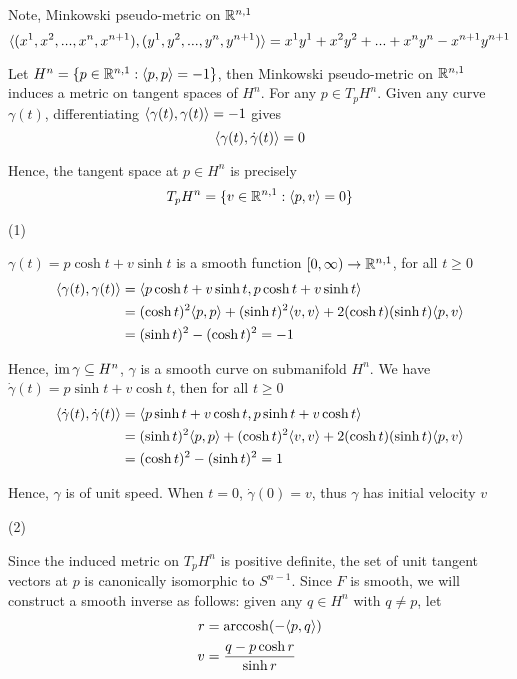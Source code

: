 \begin{longproof}
	Note, Minkowski pseudo-metric on $\mathbb{R}^{n, 1}$
	$$
		\langle(x^1, x^2, ..., x^n, x^{n+1}), (y^1, y^2, ..., y^n, y^{n+1})\rangle = x^1 y^1 + x^2 y^2 + ... + x^n y^n - x^{n+1} y^{n+1}
	$$
	
	Let $H^n = \{p \in \mathbb{R}^{n, 1}: \langle p, p\rangle = -1\}$, then Minkowski pseudo-metric on $\mathbb{R}^{n, 1}$ induces a metric on tangent spaces of $H^n$. For any $p \in T_p H^n$. Given any curve $\gamma(t)$, differentiating $\langle\gamma(t), \gamma(t)\rangle = -1$ gives
	$$
		\langle\gamma(t), \dot{\gamma}(t)\rangle = 0
	$$
	
	Hence, the tangent space at $p \in H^n$ is precisely
	$$
		T_p H^n = \{v \in \mathbb{R}^{n, 1}: \langle p, v\rangle = 0\}
	$$
	
	
	(1)
	
	$\gamma(t) = p \cosh t + v \sinh t$ is a smooth function $[0, \infty) \to \mathbb{R}^{n, 1}$, for all $t \geq 0$
	\begin{align*}
		\langle\gamma(t), \gamma(t)\rangle
		&= \langle p \cosh t + v \sinh t, p \cosh t + v \sinh t\rangle \\
		&= (\cosh t)^2 \langle p, p\rangle + (\sinh t)^2 \langle v, v\rangle + 2 (\cosh t)(\sinh t) \langle p, v\rangle \\
		&= (\sinh t)^2 - (\cosh t)^2 = -1
	\end{align*}
	
	Hence, $\operatorname{im} \gamma \subseteq H^n$, $\gamma$ is a smooth curve on submanifold $H^n$. We have $\dot{\gamma}(t) = p \sinh t + v \cosh t$, then for all $t \geq 0$
	\begin{align*}
		\langle\dot{\gamma}(t), \dot{\gamma}(t)\rangle
		&= \langle p \sinh t + v \cosh t, p \sinh t + v \cosh t\rangle \\
		&= (\sinh t)^2 \langle p, p\rangle + (\cosh t)^2 \langle v, v\rangle + 2 (\cosh t)(\sinh t) \langle p, v\rangle \\
		&= (\cosh t)^2 - (\sinh t)^2 = 1
	\end{align*}
	
	Hence, $\gamma$ is of unit speed. When $t = 0$, $\dot{\gamma}(0) = v$, thus $\gamma$ has initial velocity $v$
	
	(2)
	
	Since the induced metric on $T_p H^n$ is positive definite, the set of unit tangent vectors at $p$ is canonically isomorphic to $S^{n-1}$. Since $F$ is smooth, we will construct a smooth inverse as follows: given any $q \in H^n$ with $q \neq p$, let
	\begin{align*}
		r &= \operatorname{arccosh} (- \langle p, q\rangle) \\
		v &= \frac{q - p \cosh r}{\sinh r}
	\end{align*}
	

\end{longproof}
